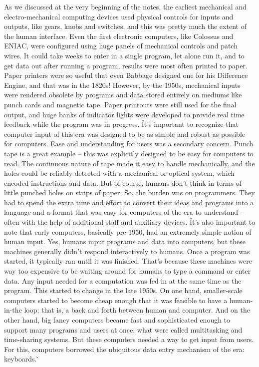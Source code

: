 As we discussed at the very beginning of the notes, the earliest mechanical and electro-mechanical computing devices
used physical controls for inputs and outputs, like gears, knobs and switches, and this was pretty much the extent of
the human interface. Even the first electronic computers, like Colossus and ENIAC, were configured using huge panels
of mechanical controls and patch wires. It could take weeks to enter in a single program, let alone run it, and to
get data out after running a program, results were most often printed to paper. Paper printers were so useful that
even Babbage designed one for his Difference Engine, and that was in the 1820s! However, by the 1950s, mechanical
inputs were rendered obsolete by programs and data stored entirely on mediums like punch cards and magnetic tape.
Paper printouts were still used for the final output, and huge banks of indicator lights were developed to provide
real time feedback while the program was in progress. \v

It's important to recognize that computer input of this era was designed to be as simple and robust as possible for
computers. Ease and understanding for users was a secondary concern. Punch tape is a great example – this was
explicitly designed to be easy for computers to read. The continuous nature of tape made it easy to handle
mechanically, and the holes could be reliably detected with a mechanical or optical system, which encoded
instructions and data. But of course, humans don't think in terms of little punched holes on strips of paper. So, the
burden was on programmers. They had to spend the extra time and effort to convert their ideas and programs into a
language and a format that was easy for computers of the era to understand – often with the help of additional staff
and auxiliary devices. \v

It's also important to note that early computers, basically pre-1950, had an extremely simple notion of human input.
Yes, humans input programs and data into computers, but these machines generally didn't respond interactively to
humans. Once a program was started, it typically ran until it was finished. That's because these machines were way
too expensive to be waiting around for humans to type a command or enter data. Any input needed for a computation was
fed in at the same time as the program. \v

This started to change in the late 1950s. On one hand, smaller-scale computers started to become cheap enough that it
was feasible to have a human-in-the loop; that is, a back and forth between human and computer. And on the other
hand, big fancy computers became fast and sophisticated enough to support many programs and users at once, what were
called multitasking and time-sharing systems. But these computers needed a way to get input from users. For this,
computers borrowed the ubiquitous data entry mechanism of the era: keyboards. \v

